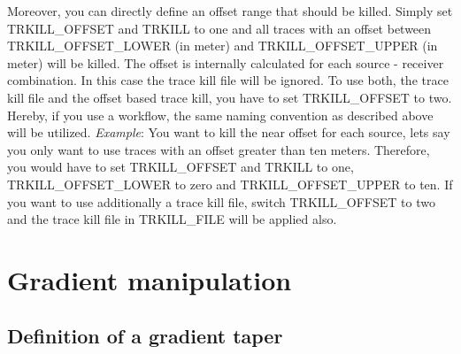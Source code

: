 Moreover, you can directly define an offset range that should be killed. Simply set TRKILL\_OFFSET and TRKILL to one and all traces with an offset between TRKILL\_OFFSET\_LOWER (in meter) and TRKILL\_OFFSET\_UPPER (in meter) will be killed. The offset is internally calculated for each source - receiver combination.  In this case the trace kill file will be ignored. To use both, the trace kill file and the offset based trace kill, you have to set TRKILL\_OFFSET to two. Hereby, if you use a workflow, the same naming convention as described above will be utilized. 
\textit{Example}: You want to kill the near offset for each source, lets say you only want to use traces with an offset greater than ten meters. Therefore, you would have to set TRKILL\_OFFSET and TRKILL to one, TRKILL\_OFFSET\_LOWER to zero and TRKILL\_OFFSET\_UPPER to ten. If you want to use additionally a trace kill file, switch TRKILL\_OFFSET to two and the trace kill file in TRKILL\_FILE will be applied also.

\section{Gradient manipulation}
\subsection{Definition of a gradient taper}
\label{sec:Definition_of_gradient_taper_geometry}
{\color{blue}{\begin{verbatim}
"Definition of gradient taper geometry" : "comment",
			"SWS_TAPER_GRAD_VERT" : "0",
			"SWS_TAPER_GRAD_HOR" : "0",
			"GRADT1 , GRADT2 , GRADT3 , GRADT4" : "5 , 15 , 490 , 500",
			"SWS_TAPER_GRAD_SOURCES" : "0",
			"SWS_TAPER_CIRCULAR_PER_SHOT" : "0",
			"SRTSHAPE" : "1",
			"SRTRADIUS" : "5.0",
			"FILTSIZE" : "1",
			"SWS_TAPER_FILE" : "0",
			"SWS_TAPER_FILE_PER_SHOT" : "0",
			"TAPER_FILE_NAME" : "taper",
\end{verbatim}}}

{\color{red}{\begin{verbatim}
Default values are:
SWS_TAPER_GRAD_VERT=0
SWS_TAPER_GRAD_HOR=0
SWS_TAPER_GRAD_SOURCES=0
SWS_TAPER_CIRCULAR_PER_SHOT=0
SWS_TAPER_FILE=0
SWS_TAPER_FILE_PER_SHOT=0
\end{verbatim}}}

